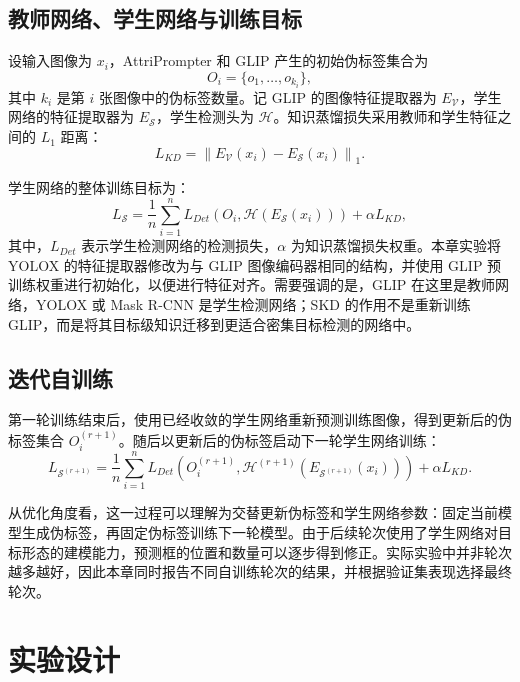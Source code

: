 \subsection{教师网络、学生网络与训练目标}

设输入图像为 $x_i$，AttriPrompter 和 GLIP 产生的初始伪标签集合为
\begin{equation}
O_i=\{o_1,\ldots,o_{k_i}\},
\end{equation}
其中 $k_i$ 是第 $i$ 张图像中的伪标签数量。记 GLIP 的图像特征提取器为 $E_{\mathcal V}$，学生网络的特征提取器为 $E_{\mathcal S}$，学生检测头为 $\mathcal H$。知识蒸馏损失采用教师和学生特征之间的 $L_1$ 距离：
\begin{equation}
\label{eq:attrip_kd}
L_{KD}=\left\|E_{\mathcal V}(x_i)-E_{\mathcal S}(x_i)\right\|_1.
\end{equation}

学生网络的整体训练目标为：
\begin{equation}
\label{eq:attrip_student}
L_{\mathcal S}=\frac{1}{n}\sum_{i=1}^{n}
L_{Det}\left(O_i,\mathcal H(E_{\mathcal S}(x_i))\right)
+\alpha L_{KD},
\end{equation}
其中，$L_{Det}$ 表示学生检测网络的检测损失，$\alpha$ 为知识蒸馏损失权重。本章实验将 YOLOX 的特征提取器修改为与 GLIP 图像编码器相同的结构，并使用 GLIP 预训练权重进行初始化，以便进行特征对齐。需要强调的是，GLIP 在这里是教师网络，YOLOX 或 Mask R-CNN 是学生检测网络；SKD 的作用不是重新训练 GLIP，而是将其目标级知识迁移到更适合密集目标检测的网络中。

\subsection{迭代自训练}

第一轮训练结束后，使用已经收敛的学生网络重新预测训练图像，得到更新后的伪标签集合 $O_i^{(r+1)}$。随后以更新后的伪标签启动下一轮学生网络训练：
\begin{equation}
\label{eq:attrip_iterative}
L_{\mathcal S^{(r+1)}}=\frac{1}{n}\sum_{i=1}^{n}
L_{Det}\left(O_i^{(r+1)},
\mathcal H^{(r+1)}(E_{\mathcal S^{(r+1)}}(x_i))\right)
+\alpha L_{KD}.
\end{equation}

从优化角度看，这一过程可以理解为交替更新伪标签和学生网络参数：固定当前模型生成伪标签，再固定伪标签训练下一轮模型。由于后续轮次使用了学生网络对目标形态的建模能力，预测框的位置和数量可以逐步得到修正。实际实验中并非轮次越多越好，因此本章同时报告不同自训练轮次的结果，并根据验证集表现选择最终轮次。

\section{实验设计}

